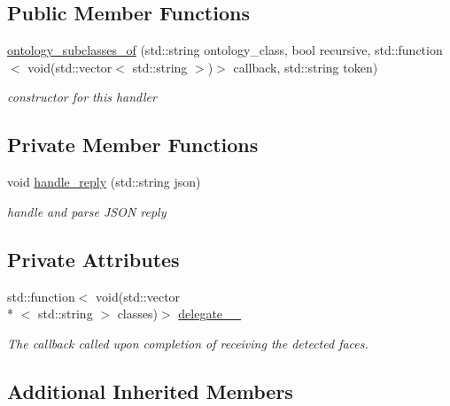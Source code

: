 \subsection*{Public Member Functions}
\begin{DoxyCompactItemize}
\item 
\hyperlink{classrapp_1_1cloud_1_1ontology__subclasses__of_a896e6b0507ab89fb29f3dfa66e016725}{ontology\-\_\-subclasses\-\_\-of} (std\-::string ontology\-\_\-class, bool recursive, std\-::function$<$ void(std\-::vector$<$ std\-::string $>$)$>$ callback, std\-::string token)
\begin{DoxyCompactList}\small\item\em constructor for this handler \end{DoxyCompactList}\end{DoxyCompactItemize}
\subsection*{Private Member Functions}
\begin{DoxyCompactItemize}
\item 
void \hyperlink{classrapp_1_1cloud_1_1ontology__subclasses__of_a5d00771521da262c68f56ef1ed8b445c}{handle\-\_\-reply} (std\-::string json)
\begin{DoxyCompactList}\small\item\em handle and parse J\-S\-O\-N reply \end{DoxyCompactList}\end{DoxyCompactItemize}
\subsection*{Private Attributes}
\begin{DoxyCompactItemize}
\item 
std\-::function$<$ void(std\-::vector\\*
$<$ std\-::string $>$ classes)$>$ \hyperlink{classrapp_1_1cloud_1_1ontology__subclasses__of_aeb3a336a15f21b3a924382d168382d3b}{delegate\-\_\-\-\_\-}
\begin{DoxyCompactList}\small\item\em The callback called upon completion of receiving the detected faces. \end{DoxyCompactList}\end{DoxyCompactItemize}
\subsection*{Additional Inherited Members}


